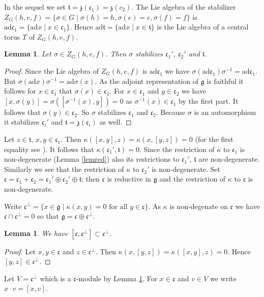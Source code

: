 \documentclass[a4paper,10pt]{amsart}
\newcommand{\mf}{\mathfrak}
\newcommand{\g}{\mf{g}}
\renewcommand{\c}{\mf{c}}
\newcommand{\z}{\mf{z}}
\newcommand{\ttt}{\mf{t}}
\newcommand{\ad}{\mathrm{ad}}
\numberwithin{equation}{section}
\newtheorem{lemma}[theorem]{Lemma}
\theoremstyle{remark}
\theoremstyle{remark}
\begin{document}
In the sequel we set $\ttt= \z(\c_1)=\z(c_2)$. The Lie algebra of the stabilizer
$Z_G(h,e,f) = \{ \sigma\in G \mid \sigma(h)=h, \sigma(e)=e, \sigma(f)=f\}$
is $\ad \c_1 = \{ \ad x \mid x\in \c_1\}$. Hence $\ad\ttt = \{\ad x\mid
x\in \ttt\}$ is the Lie algebra of a central torus $T$ of $Z_G(h,e,f)$. 

\begin{lemma}\label{lem1}
Let $\sigma\in Z_G(h,e,f)$. Then $\sigma$ stabilizes $\c_1'$, $\c_2'$ and
$\ttt$.   
\end{lemma}

\begin{proof}
Since the Lie algebra of $Z_G(h,e,f)$ is $\ad \c_1$ we have $\sigma (\ad \c_1)
\sigma^{-1} = \ad \c_1$. But $\sigma (\ad x ) \sigma^{-1} = \ad \sigma(x)$.
As the adjoint representation of $\g$ is faithful it follows for
$x\in \c_1$ that $\sigma(x)\in \c_1$. For $x\in \c_1$ and $y\in \c_2$ we
have $[x,\sigma(y)] = \sigma([\sigma^{-1}(x),y])=0$ as $\sigma^{-1}(x)\in \c_1$
by the first part. It follows that $\sigma(y)\in \c_2$. So $\sigma$ stabilizes
$\c_1$ and $\c_2$. Because $\sigma$ is an automorphism it stabilizes
$\c_i'$ and $\ttt=\z(\c_i)$ as well.
\end{proof}

Let $z\in \ttt$, $x,y\in \c_1$. Then $\kappa([x,y],z) = \kappa(x,[y,z])=0$
(for the first equality see \cite[\S 4.3]{hum}).
It follows that $\kappa(\c_1',\ttt)=0$. Since the restriction of $\kappa$ to
$\c_1$ is non-degenerate (Lemma \ref{lemred}) also its restrictions to
$\c_1'$, $\ttt$ are non-degenerate. Similarly we see that the restriction of
$\kappa$ to $\c_2'$ is non-degenerate. Set $\c = \c_1 + \c_2 =
\c_1'\oplus \c_2'\oplus \ttt$; then $\c$ is reductive in $\g$ and the
restriction of $\kappa$ to $\c$ is non-degenerate. 

Write $\c^\perp = \{ x\in \g\mid \kappa(x,y)=0 \text{ for all } y\in \c\}$.
As $\kappa$ is non-degenate on $\c$ we have $\c\cap \c^\perp=0$ so that
$\g = \c\oplus \c^\perp$.

\begin{lemma}\label{lem2}
We have $[\c,\c^\perp]\subset \c^\perp$.
\end{lemma}

\begin{proof}
Let $x,y\in \c$ and $z\in\c^\perp$. Then $\kappa(x,[y,z]) = \kappa([x,y],z)=0$.
Hence $[y,z] \in \c^\perp$. 
\end{proof}  

Let $V=\c^\perp$ which is a $\c$-module by Lemma \ref{lem2}. For $x\in \c$ and
$v\in V$ we write $x\cdot v = [x,v]$.
\end{document}
